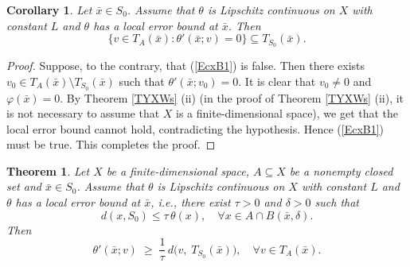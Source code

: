 \documentclass[11pt]{article}
\newtheorem{theorem}{Theorem}[section]
\newtheorem{corollary}{Corollary}[section]
\begin{document}
\begin{corollary}  \label{CtgXEQ}     Let  $\bar{x} \in S_0$. Assume that     $\theta$ is   Lipschitz continuous on $X$ with constant $L$   and     $\theta$ has a  local error bound at $\bar x$. Then 	
	\begin{equation}\label{EcxB1}
		\{v \in T_A(\bar x) : \theta'(\bar x; v) = 0\} \subseteq T_{S_0}(\bar x).
	\end{equation}
\end{corollary}
\begin{proof}   Suppose, to the contrary, that  (\ref{EcxB1}) is false.  Then there exists \(v_0\in T_A(\bar x)\setminus T_{S_0}(\bar x)\) such that \(\theta'(\bar x;v_0)=0\).   It is clear that $v_0 \neq 0$ and  \(\varphi(\bar x)=0\).  By Theorem   \ref{TYXWs}   (ii)   (in the proof of Theorem   \ref{TYXWs}   (ii), it is not necessary to assume that $X$ is a finite-dimensional space), we get that the local error bound cannot hold, contradicting the hypothesis.  Hence  (\ref{EcxB1}) must be true.   This completes the proof. 
\end{proof} 





\begin{theorem}  \label{TnbEQ}     Let \(X\) be a  finite-dimensional  space, \(A\subseteq X\) be a  nonempty closed set and 
	\(\bar{x}\in S_0\).  Assume that \(\theta\) is    Lipschitz continuous on \(X\) with constant $L$ and \(\theta\) has a  local error bound  at \(\bar{x}\), i.e., there exist   $\tau>0$  and  $ \delta>0$ such that
	\begin{equation}\label{EfdB1}
		d (x,S_0)\le \tau\,\theta(x),   \quad\forall x\in A\cap B(\bar{x},\delta).
	\end{equation}
	Then 
	\[
	\theta'(\bar{x};v)\;\ge\;\frac{1}{\tau}\,d \bigl(v,\;T_{S_0}(\bar{x})\bigr),   \quad  \forall v\in T_A(\bar{x}).
	\]
\end{theorem}
\end{document}
